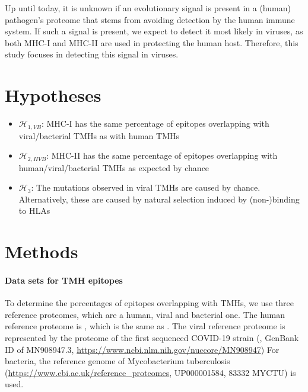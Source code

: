 Up until today, it is unknown if an evolutionary signal 
is present in a (human) pathogen's proteome that stems from avoiding
detection by the human immune system.
If such a signal is present, we expect to detect it most likely in
viruses, as both MHC-I and MHC-II are used in protecting the
human host. 
Therefore, this study focuses in detecting this signal in viruses.

\section{Hypotheses}


\begin{itemize}
  \item $\mathcal{H}_{1,VB}$: MHC-I has the same percentage of epitopes overlapping
    with viral/bacterial TMHs as with human TMHs
  \item $\mathcal{H}_{2,HVB}$: MHC-II has the same percentage of epitopes overlapping
    with human/viral/bacterial TMHs as expected by chance
  \item $\mathcal{H}_{3}$: The mutations observed in 
    viral TMHs are caused by chance.
    Alternatively, these are caused by natural selection
    induced by (non-)binding to HLAs
\end{itemize}

\section{Methods}

\paragraph{Data sets for TMH epitopes}

To determine the percentages of epitopes overlapping
with TMHs, we use three reference proteomes, which are
a human, viral and bacterial one.
The human reference proteome is , 
which is the same as \cite{bianchi2017}.
The viral reference proteome is represented by
the proteome of the first sequenced COVID-19 strain (\cite{wu2020new},
GenBank ID of MN908947.3, \url{https://www.ncbi.nlm.nih.gov/nuccore/MN908947})
For bacteria, the reference genome of 
Mycobacterium tuberculosis (\url{https://www.ebi.ac.uk/reference_proteomes}, UP000001584, 
83332 MYCTU) is used.

